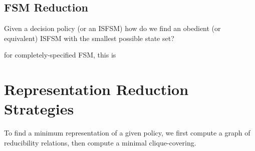 \subsection{FSM Reduction}
Given a decision policy (or an ISFSM) how do we find an obedient (or
equivalent) ISFSM with the smallest possible state set?

for completely-specified FSM, this is 
\section{Representation Reduction Strategies}


To find a minimum representation of a given policy,
we first compute a graph of reducibility relations, 
then compute a minimal clique-covering.
\setcounter{subfigure}{0}
\begin{figure}[ht]
\centering
{}\qquad
{}
\end{figure}
